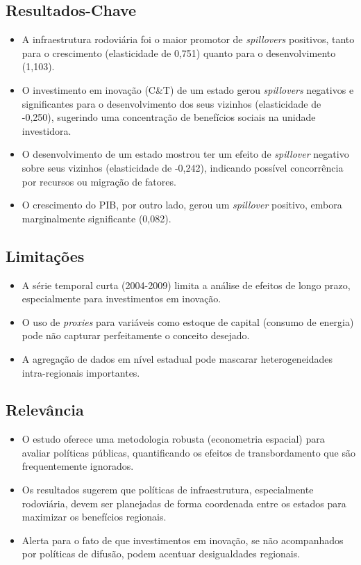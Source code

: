 \documentclass[12pt]{article}
\begin{document}
\subsection*{Resultados-Chave}
\begin{itemize}
    \item A infraestrutura rodoviária foi o maior promotor de \textit{spillovers} positivos, tanto para o crescimento (elasticidade de 0,751) quanto para o desenvolvimento (1,103).
    \item O investimento em inovação (C\&T) de um estado gerou \textit{spillovers} negativos e significantes para o desenvolvimento dos seus vizinhos (elasticidade de -0,250), sugerindo uma concentração de benefícios sociais na unidade investidora.
    \item O desenvolvimento de um estado mostrou ter um efeito de \textit{spillover} negativo sobre seus vizinhos (elasticidade de -0,242), indicando possível concorrência por recursos ou migração de fatores.
    \item O crescimento do PIB, por outro lado, gerou um \textit{spillover} positivo, embora marginalmente significante (0,082).
\end{itemize}

\subsection*{Limitações}
\begin{itemize}
    \item A série temporal curta (2004-2009) limita a análise de efeitos de longo prazo, especialmente para investimentos em inovação.
    \item O uso de \textit{proxies} para variáveis como estoque de capital (consumo de energia) pode não capturar perfeitamente o conceito desejado.
    \item A agregação de dados em nível estadual pode mascarar heterogeneidades intra-regionais importantes.
\end{itemize}

\subsection*{Relevância}
\begin{itemize}
    \item O estudo oferece uma metodologia robusta (econometria espacial) para avaliar políticas públicas, quantificando os efeitos de transbordamento que são frequentemente ignorados.
    \item Os resultados sugerem que políticas de infraestrutura, especialmente rodoviária, devem ser planejadas de forma coordenada entre os estados para maximizar os benefícios regionais.
    \item Alerta para o fato de que investimentos em inovação, se não acompanhados por políticas de difusão, podem acentuar desigualdades regionais.
\end{itemize}
\end{document}
